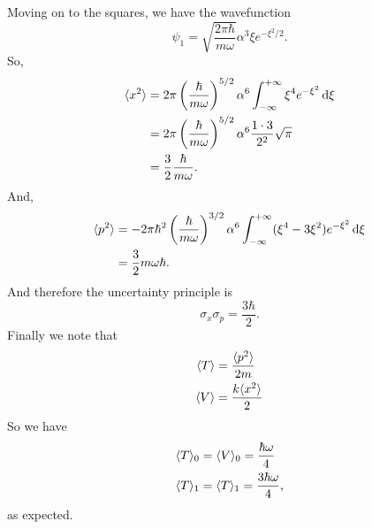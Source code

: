 \begin{wex}
\begin{equation}
\end{equation}
Moving on to the squares, we have the wavefunction
\begin{equation}
\psi_1=\sqrt{\frac{2\pi\hbar}{m\omega}}\alpha^3\xi e^{-\xi^2/2}.
\end{equation}
So,
\begin{subequations}
\begin{align}
\lgl x^2\rgl&=2\pi\lf(\frac{\hbar}{m\omega} \rt)^{5/2}\alpha^6\intinf\xi^4e^{-\xi^2}\dif\xi\\
&=2\pi\lf(\frac{\hbar}{m\omega} \rt)^{5/2}\alpha^6\frac{1\cdot3}{2^2}\sqrt{\pi}\\
&=\frac{3}{2}\frac{\hbar}{m\omega}.
\end{align}
\end{subequations}
And, 
\begin{subequations}
\begin{align}
\lgl p^2\rgl&=-2\pi\hbar^2\lf(\frac{\hbar}{m\omega} \rt)^{3/2}\alpha^6\intinf(\xi^4-3\xi^2)e^{-\xi^2}\dif\xi\\
&=\frac{3}{2}m\omega\hbar.
\end{align}
\end{subequations}
And therefore the uncertainty principle is 
\begin{equation}
\sigma_x\sigma_p=\frac{3\hbar}{2}. 
\end{equation}
Finally we note that 
\begin{subequations}
\begin{align}
\langle T\rangle&=\frac{\langle p^2\rangle}{2m} \\
\langle V\rangle&=\frac{k\langle x^2\rangle}{2}
\end{align}
\end{subequations}
So we have
\begin{subequations}
\begin{align}
\langle T\rangle_0&=\langle V\rangle_0=\frac{\hbar\omega}{4}\\
\langle T\rangle_1&=\langle T\rangle_1=\frac{3\hbar\omega}{4}, 
\end{align}
\end{subequations}
as expected.
\end{wex}
